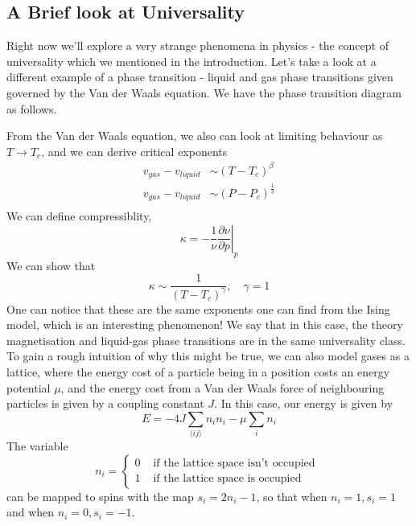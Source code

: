 \subsection{A Brief look at Universality} 
Right now we'll explore a very strange phenomena in physics - the concept of universality which we mentioned in the introduction. Let's take a look at a different example of a phase transition - liquid and gas phase transitions given governed by the Van der Waals equation. We have the phase transition diagram as follows. 

From the Van der Waals equation, we also can look at limiting behaviour as $T \rightarrow T_c $, and we can derive critical exponents
\begin{align*} 
v_{gas}  - v_{liquid} & \sim (T - T_c)^\beta \\
v_{gas}  - v_{liquid } &  \sim (P - P_c)^{\frac{ 1}{ \delta } } \\
\end{align*} We can define compressiblity, 
\[ 
\kappa =  - \frac{1}{ \nu } \left.  \frac{ \partial \nu }{ \partial p } \right\vert_p 
\] 
We can show that \[ 
\kappa \sim \frac{1}{ (T - T_c)^{ \gamma} } , \quad \gamma  = 1 
\]
One can notice that these are the same exponents one can find from the Ising model, which is an interesting phenomenon! We say that in this case, the theory magnetisation and liquid-gas phase transitions are in the same universality class. To gain a rough intuition of why this might be true, we can also model gases as a lattice, where the energy cost of a particle being in a position costs an energy potential $\mu$, and the energy cost from a Van der Waals force of neighbouring particles is given by a coupling constant $J$. In this case, our energy is given by 
\[ 
E =  - 4J \sum_{ \langle ij \rangle} n_i n_i  - \mu \sum_i n_i
\] 
The variable 
\[ 
n_i = \begin{cases} 
	0 & \text{ if the lattice space isn't occupied } \\
	1 & \text{ if the lattice space is occupied } 
	\end{cases} 
\] can be mapped to spins with the map $ s_i = 2n_i - 1$, so that when $n_i = 1, s_i =1 $ and when  $n_i   = 0, s_i = -1$. 

\pagebreak 
